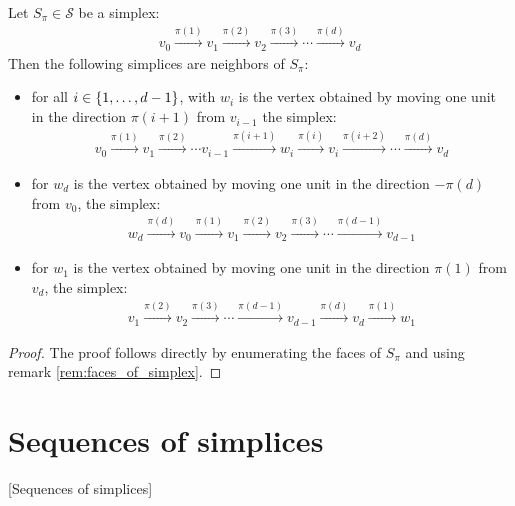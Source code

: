 \begin{lemma}
	Let $S_{\pi} \in \mathcal{S}$ be a simplex:
	\begin{align*}
		v_0 \xrightarrow{\pi(1)} v_1 \xrightarrow{\pi(2)} v_2 \xrightarrow{\pi(3)} \cdots \xrightarrow{\pi(d)} v_d
	\end{align*}
	Then the following simplices are neighbors of $S_{\pi}$:
	\begin{itemize}
		\item for all $i \in \left\{1, \dots, d-1\right\}$, with $w_i$ is the vertex obtained by moving one unit in the direction $\pi(i+1)$ from $v_{i-1}$ the simplex:
        \begin{align*}
            v_0 \xrightarrow{\pi(1)} v_1 \xrightarrow{\pi(2)} \cdots v_{i-1} \xrightarrow{\pi(i+1)} w_i \xrightarrow{\pi(i)} v_{i} \xrightarrow{\pi(i+2)} \cdots \xrightarrow{\pi(d)} v_d
        \end{align*}
		\item for $w_d$ is the vertex obtained by moving one unit in the direction $-\pi(d)$ from $v_{0}$, the simplex:
        \begin{align*}
            w_d \xrightarrow{\pi(d)} v_0 \xrightarrow{\pi(1)} v_1 \xrightarrow{\pi(2)} v_2 \xrightarrow{\pi(3)} \cdots \xrightarrow{\pi(d-1)} v_{d-1}
        \end{align*}
		\item for $w_1$ is the vertex obtained by moving one unit in the direction $\pi(1)$ from $v_{d}$, the simplex:
        \begin{align*}
            v_1 \xrightarrow{\pi(2)} v_2 \xrightarrow{\pi(3)} \cdots \xrightarrow{\pi(d-1)} v_{d-1} \xrightarrow{\pi(d)} v_d \xrightarrow{\pi(1)} w_1
        \end{align*}
	\end{itemize}
\end{lemma}
\begin{proof}
	The proof follows directly by enumerating the faces of $S_{\pi}$ and using remark \ref{rem:faces_of_simplex}.
\end{proof}

\section{Sequences of simplices}[Sequences of simplices]

